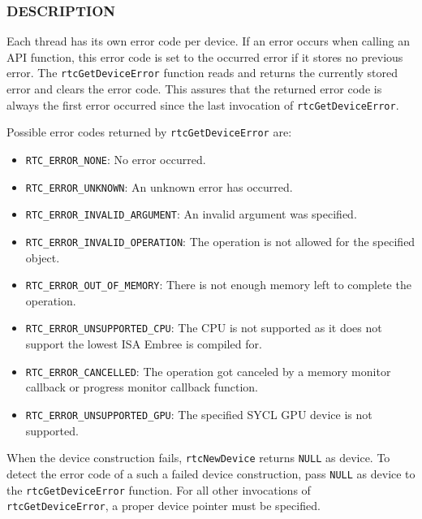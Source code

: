 \begin{Shaded}
\begin{Highlighting}[]

\OperatorTok{(}\OperatorTok{);}
\end{Highlighting}
\end{Shaded}

\subsubsection{DESCRIPTION}\label{description}

Each thread has its own error code per device. If an error occurs when
calling an API function, this error code is set to the occurred error if
it stores no previous error. The \texttt{rtcGetDeviceError} function
reads and returns the currently stored error and clears the error code.
This assures that the returned error code is always the first error
occurred since the last invocation of \texttt{rtcGetDeviceError}.

Possible error codes returned by \texttt{rtcGetDeviceError} are:

\begin{itemize}
\item
  \texttt{RTC\_ERROR\_NONE}: No error occurred.
\item
  \texttt{RTC\_ERROR\_UNKNOWN}: An unknown error has occurred.
\item
  \texttt{RTC\_ERROR\_INVALID\_ARGUMENT}: An invalid argument was
  specified.
\item
  \texttt{RTC\_ERROR\_INVALID\_OPERATION}: The operation is not allowed
  for the specified object.
\item
  \texttt{RTC\_ERROR\_OUT\_OF\_MEMORY}: There is not enough memory left
  to complete the operation.
\item
  \texttt{RTC\_ERROR\_UNSUPPORTED\_CPU}: The CPU is not supported as it
  does not support the lowest ISA Embree is compiled for.
\item
  \texttt{RTC\_ERROR\_CANCELLED}: The operation got canceled by a memory
  monitor callback or progress monitor callback function.
\item
  \texttt{RTC\_ERROR\_UNSUPPORTED\_GPU}: The specified SYCL GPU device
  is not supported.
\end{itemize}

When the device construction fails, \texttt{rtcNewDevice} returns
\texttt{NULL} as device. To detect the error code of a such a failed
device construction, pass \texttt{NULL} as device to the
\texttt{rtcGetDeviceError} function. For all other invocations of
\texttt{rtcGetDeviceError}, a proper device pointer must be specified.

